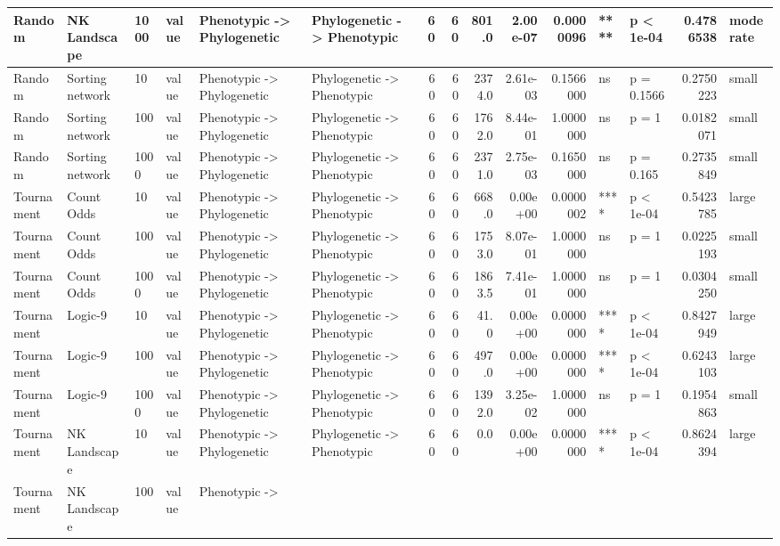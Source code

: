 \documentclass[]{book}
\begin{document}
\begin{table}
\begin{tabular}[t]{l|l|l|l|l|l|r|r|r|r|r|l|l|r|l}
\hline
Random & NK Landscape & 1000 & value & Phenotypic
    ->
Phylogenetic & Phylogenetic
    ->
Phenotypic & 60 & 60 & 801.0 & 2.00e-07 & 0.0000096 & **** & p < 1e-04 & 0.4786538 & moderate\\
\hline
Random & Sorting network & 10 & value & Phenotypic
    ->
Phylogenetic & Phylogenetic
    ->
Phenotypic & 60 & 60 & 2374.0 & 2.61e-03 & 0.1566000 & ns & p = 0.1566 & 0.2750223 & small\\
\hline
Random & Sorting network & 100 & value & Phenotypic
    ->
Phylogenetic & Phylogenetic
    ->
Phenotypic & 60 & 60 & 1762.0 & 8.44e-01 & 1.0000000 & ns & p = 1 & 0.0182071 & small\\
\hline
Random & Sorting network & 1000 & value & Phenotypic
    ->
Phylogenetic & Phylogenetic
    ->
Phenotypic & 60 & 60 & 2371.0 & 2.75e-03 & 0.1650000 & ns & p = 0.165 & 0.2735849 & small\\
\hline
Tournament & Count Odds & 10 & value & Phenotypic
    ->
Phylogenetic & Phylogenetic
    ->
Phenotypic & 60 & 60 & 668.0 & 0.00e+00 & 0.0000002 & **** & p < 1e-04 & 0.5423785 & large\\
\hline
Tournament & Count Odds & 100 & value & Phenotypic
    ->
Phylogenetic & Phylogenetic
    ->
Phenotypic & 60 & 60 & 1753.0 & 8.07e-01 & 1.0000000 & ns & p = 1 & 0.0225193 & small\\
\hline
Tournament & Count Odds & 1000 & value & Phenotypic
    ->
Phylogenetic & Phylogenetic
    ->
Phenotypic & 60 & 60 & 1863.5 & 7.41e-01 & 1.0000000 & ns & p = 1 & 0.0304250 & small\\
\hline
Tournament & Logic-9 & 10 & value & Phenotypic
    ->
Phylogenetic & Phylogenetic
    ->
Phenotypic & 60 & 60 & 41.0 & 0.00e+00 & 0.0000000 & **** & p < 1e-04 & 0.8427949 & large\\
\hline
Tournament & Logic-9 & 100 & value & Phenotypic
    ->
Phylogenetic & Phylogenetic
    ->
Phenotypic & 60 & 60 & 497.0 & 0.00e+00 & 0.0000000 & **** & p < 1e-04 & 0.6243103 & large\\
\hline
Tournament & Logic-9 & 1000 & value & Phenotypic
    ->
Phylogenetic & Phylogenetic
    ->
Phenotypic & 60 & 60 & 1392.0 & 3.25e-02 & 1.0000000 & ns & p = 1 & 0.1954863 & small\\
\hline
Tournament & NK Landscape & 10 & value & Phenotypic
    ->
Phylogenetic & Phylogenetic
    ->
Phenotypic & 60 & 60 & 0.0 & 0.00e+00 & 0.0000000 & **** & p < 1e-04 & 0.8624394 & large\\
\hline
Tournament & NK Landscape & 100 & value & Phenotypic
    ->

\end{tabular}
\end{table}
\end{document}
